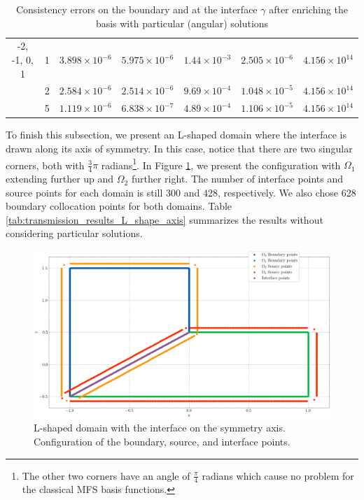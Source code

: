 \begin{table}[!htbp]
\begin{longtable}{ccccccc}
        -2, -1, 0, 1 & 1 & $3.898\times10^{-6}$ & $5.975\times10^{-6}$ & $1.44\times10^{-3}$ & $2.505\times10^{-6}$ & $4.156\times10^{14}$ \\
        & 2 & $2.584\times10^{-6}$ & $2.514\times10^{-6}$ & $9.69\times10^{-4}$ & $1.048\times10^{-5}$ & $4.156\times10^{14}$ \\
        & 5 & $1.119\times10^{-6}$ & $6.838\times10^{-7}$ & $4.89\times10^{-4}$ & $1.106\times10^{-5}$ & $4.156\times10^{14}$ \\
        \midrule[\heavyrulewidth] %
    \end{longtable}
    \caption{Consistency errors on the boundary and at the interface \(\gamma\) after enriching the basis with particular (angular) solutions}
    \label{tab:transmission_results_L_shape_rectangles_particular}
\end{table}

To finish this subsection, we present an L-shaped domain where the interface is drawn along its axis of symmetry. In this case, notice that there are two singular corners, both with \(\frac{3}{4}\pi\) radians\footnote{The other two corners have an angle of \(\frac{\pi}{4}\) radians which cause no problem for the classical \ac{MFS} basis functions.}. In Figure \ref{transmission_L_shape_col_axis_config}, we present the configuration with \(\Omega_1\) extending further up and \(\Omega_2\) further right. The number of interface points and source points for each domain is still 300 and 428, respectively. We also chose 628 boundary collocation points for both domains. Table \ref{tab:transmission_results_L_shape_axis} summarizes the results without considering particular solutions.

\begin{figure}[!htb]
    \centering
    \includegraphics[height=0.38\linewidth,width=0.5\linewidth]{Images/Transmission/L_shape_2_axis_col_points.png}
    \caption{L-shaped domain with the interface on the symmetry axis. Configuration of the boundary, source, and interface points.}
    \label{transmission_L_shape_col_axis_config}
\end{figure}

